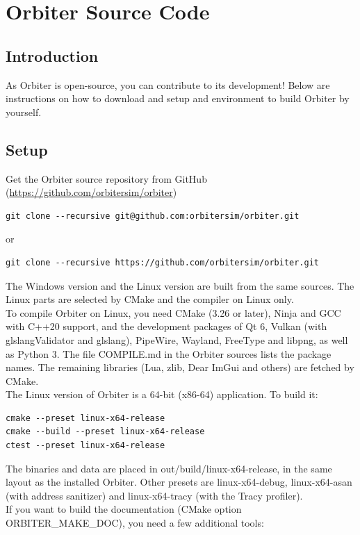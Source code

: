 \documentclass[Orbiter Developer Manual.tex]{subfiles}
\begin{document}
\section{Orbiter Source Code}

\subsection{Introduction}
As Orbiter is open-source, you can contribute to its development!
Below are instructions on how to download and setup and environment to build Orbiter by yourself.


\subsection{Setup}
Get the Orbiter source repository from GitHub (\url{https://github.com/orbitersim/orbiter})

\begin{lstlisting}
git clone --recursive git@github.com:orbitersim/orbiter.git
\end{lstlisting}

\noindent
or

\begin{lstlisting}
git clone --recursive https://github.com/orbitersim/orbiter.git
\end{lstlisting}

\noindent
The Windows version and the Linux version are built from the same sources. The Linux parts are selected by CMake and the compiler on Linux only.\\
To compile Orbiter on Linux, you need CMake (3.26 or later), Ninja and GCC with C++20 support, and the development packages of Qt 6, Vulkan (with glslangValidator and glslang), PipeWire, Wayland, FreeType and libpng, as well as Python 3. The file COMPILE.md in the Orbiter sources lists the package names. The remaining libraries (Lua, zlib, Dear ImGui and others) are fetched by CMake.\\
The Linux version of Orbiter is a 64-bit (x86-64) application. To build it:

\begin{lstlisting}
cmake --preset linux-x64-release
cmake --build --preset linux-x64-release
ctest --preset linux-x64-release
\end{lstlisting}

\noindent
The binaries and data are placed in out/build/linux-x64-release, in the same layout as the installed Orbiter. Other presets are linux-x64-debug, linux-x64-asan (with address sanitizer) and linux-x64-tracy (with the Tracy profiler).\\
If you want to build the documentation (CMake option ORBITER\_MAKE\_DOC), you need a few additional tools:
\end{document}
